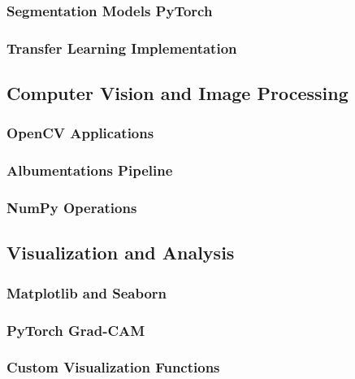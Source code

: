 \documentclass[12pt,a4paper]{report}
\begin{document}
\subsubsection{Segmentation Models PyTorch}

\subsubsection{Transfer Learning Implementation}

\subsection{Computer Vision and Image Processing}

\subsubsection{OpenCV Applications}

\subsubsection{Albumentations Pipeline}

\subsubsection{NumPy Operations}

\subsection{Visualization and Analysis}

\subsubsection{Matplotlib and Seaborn}

\subsubsection{PyTorch Grad-CAM}

\subsubsection{Custom Visualization Functions}
\end{document}
